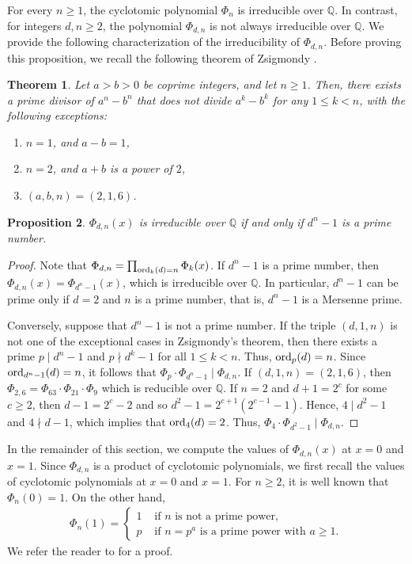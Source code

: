 \documentclass[10pt,leqno]{amsart}
\newtheorem{theorem}{Theorem}[section]
\newtheorem{proposition}[theorem]{Proposition}
\theoremstyle{definition}
\theoremstyle{remark}
\numberwithin{equation}{section}
\def\qq{\mathbb{Q}}
\def\ord{{\rm ord}}
\begin{document}
For every $n\geq 1$, the cyclotomic polynomial $\Phi_n$ is irreducible over $\qq$. In contrast, for integers $d,n\geq 2$, the polynomial $\Phi_{d,n}$ is not always irreducible over $\qq$. We provide the following characterization of the irreducibility of $\Phi_{d,n}$. Before proving this proposition, we recall the following theorem of Zsigmondy \cite{Zsigmondy92}.

\begin{theorem}
    Let $a>b>0$ be coprime integers, and let $n\geq 1$. Then, there exists a prime divisor of $a^n-b^n$ that does not divide $a^k-b^k$ for any $1\leq k<n$, with the following exceptions:
    \begin{enumerate}
        \item $n = 1$, and $a-b = 1$,
        \item $n = 2$, and $a+b$ is a power of $2$,
        \item $(a,b,n) = (2,1,6)$.
    \end{enumerate}
\end{theorem}

\begin{proposition}
    $\Phi_{d,n}(x)$ is irreducible over $\qq$ if and only if $d^n-1$ is a prime number.
\end{proposition}

\begin{proof}
    Note that $\Phi_{d,n} = \prod_{\ord_k(d) = n}\Phi_k(x)$. If $d^n-1$ is a prime number, then $\Phi_{d,n}(x) = \Phi_{d^n-1}(x)$, which is irreducible over $\qq$. In particular, $d^n-1$ can be prime only if $d = 2$ and $n$ is a prime number, that is, $d^n-1$ is a Mersenne prime.

    Conversely, suppose that $d^n-1$ is not a prime number. If the triple $(d,1,n)$ is not one of the exceptional cases in Zsigmondy's theorem, then there exists a prime $p\mid d^n-1$ and $p\nmid d^k-1$ for all $1\leq k<n$. Thus, $\ord_p(d) = n$. Since $\ord_{d^n-1}(d) = n$, it follows that $\Phi_p\cdot\Phi_{d^n-1}\mid \Phi_{d,n}$.  If $(d,1,n) = (2,1,6)$, then $\Phi_{2,6} = \Phi_{63}\cdot\Phi_{21}\cdot\Phi_9$ which is reducible over $\qq$. If $n = 2$ and $d+1 = 2^c$ for some $c\geq 2$, then $d-1 = 2^c-2$ and so $d^2-1 = 2^{c+1}(2^{c-1}-1)$. Hence, $4\mid d^2-1$ and $4\nmid d-1$, which implies that $\ord_4(d) = 2$. Thus, $\Phi_4\cdot\Phi_{d^2-1}\mid \Phi_{d,n}$.
\end{proof}

In the remainder of this section, we compute the values of $\Phi_{d,n}(x)$ at $x = 0$ and $x = 1$. Since $\Phi_{d,n}$ is a product of cyclotomic polynomials, we first recall the values of cyclotomic polynomials at $x = 0$ and $x = 1$. For $n\geq 2$, it is well known that $\Phi_n(0) = 1$. On the other hand,
\begin{align*}
    \Phi_n(1) = \begin{cases}
        1&\text{ if }n\text{ is not a prime power},\\
        p&\text{ if }n = p^a\text{ is a prime power with }a\geq 1.
    \end{cases}
\end{align*}
We refer the reader to \cite[Section 4.1]{Lang94} for a proof.
\end{document}

